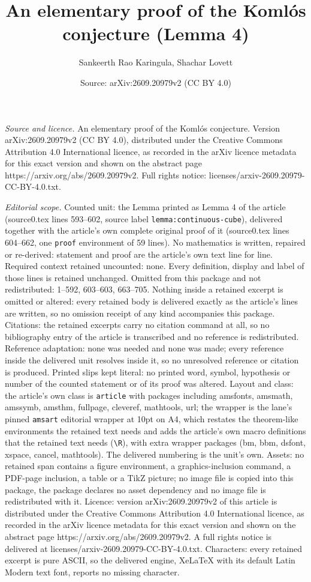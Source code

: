 \documentclass[10pt,a4paper]{amsart}
\title[An elementary proof of the Koml\'os conjecture]{An elementary proof of the Koml\'os conjecture (Lemma 4)}
\author{Sankeerth Rao Karingula, Shachar Lovett}
\date{Source: arXiv:2609.20979v2 (CC BY 4.0)}
\begin{document}
\maketitle

\noindent\emph{Source and licence.} An elementary proof of the Koml\'os conjecture. Version arXiv:2609.20979v2 (CC BY 4.0), distributed under the Creative Commons Attribution 4.0 International licence, as recorded in the arXiv licence metadata for this exact version and shown on the abstract page https://arxiv.org/abs/2609.20979v2. Full rights notice: licenses/arxiv-2609.20979-CC-BY-4.0.txt.\par\smallskip

\noindent\textit{Editorial scope.} Counted unit: the Lemma printed as Lemma 4 of the article (source0.tex lines 593--602, source label \texttt{lemma:continuous-cube}), delivered together with the article's own complete original proof of it (source0.tex lines 604--662, one \texttt{proof} environment of 59 lines). No mathematics is written, repaired or re-derived: statement and proof are the article's own text line for line. Required context retained uncounted: none. Every definition, display and label of those lines is retained unchanged. Omitted from this package and not redistributed: 1--592, 603--603, 663--705. Nothing inside a retained excerpt is omitted or altered: every retained body is delivered exactly as the article's lines are written, so no omission receipt of any kind accompanies this package. Citations: the retained excerpts carry no citation command at all, so no bibliography entry of the article is transcribed and no reference is redistributed. Reference adaptation: none was needed and none was made; every reference inside the delivered unit resolves inside it, so no unresolved reference or citation is produced. Printed slips kept literal: no printed word, symbol, hypothesis or number of the counted statement or of its proof was altered. Layout and class: the article's own class is \texttt{article} with packages including amsfonts, amsmath, amssymb, amsthm, fullpage, cleveref, mathtools, url; the wrapper is the lane's pinned \texttt{amsart} editorial wrapper at 10pt on A4, which restates the theorem-like environments the retained text needs and adds the article's own macro definitions that the retained text needs (\texttt{\textbackslash R}), with extra wrapper packages (bm, bbm, dsfont, xspace, cancel, mathtools). The delivered numbering is the unit's own. Assets: no retained span contains a figure environment, a graphics-inclusion command, a PDF-page inclusion, a table or a TikZ picture; no image file is copied into this package, the package declares no asset dependency and no image file is redistributed with it. Licence: version arXiv:2609.20979v2 of this article is distributed under the Creative Commons Attribution 4.0 International licence, as recorded in the arXiv licence metadata for this exact version and shown on the abstract page https://arxiv.org/abs/2609.20979v2. A full rights notice is delivered at licenses/arxiv-2609.20979-CC-BY-4.0.txt. Characters: every retained excerpt is pure ASCII, so the delivered engine, XeLaTeX with its default Latin Modern text font, reports no missing character.
\end{document}
